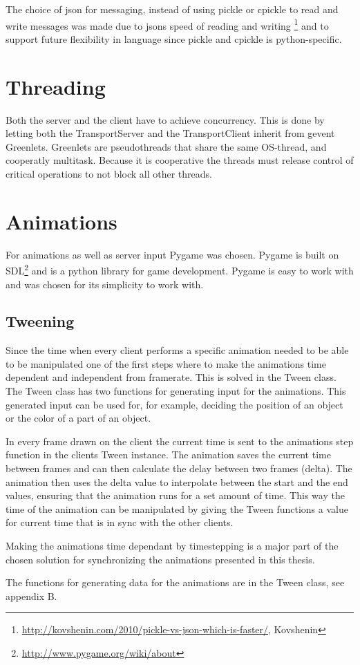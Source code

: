 The choice of json for messaging, instead of using pickle or cpickle to read and write messages was made due to jsons speed of reading and writing \footnote{\url{http://kovshenin.com/2010/pickle-vs-json-which-is-faster/}, Kovshenin} and to support future flexibility in language since pickle and cpickle is python-specific. 



\section{Threading}
\label{sec:threading}

Both the server and the client have to achieve concurrency. This is done by letting both the TransportServer and the TransportClient inherit from gevent Greenlets. 
Greenlets are pseudothreads that share the same OS-thread, and cooperatly multitask. Because it is cooperative the threads must release control of critical operations to not block all other threads. 

\section{Animations}

For animations as well as server input Pygame was chosen. Pygame is built on SDL\footnote{\url{http://www.pygame.org/wiki/about}} and is a python library for game development. Pygame is easy to work with and was chosen for its simplicity to work with.

\subsection{Tweening}

Since the time when every client performs a specific animation needed to be able to be manipulated one of the first steps where to make the animations time dependent and independent from framerate. This is solved in the Tween class. The Tween class has two functions for generating input for the animations. This generated input can be used for, for example, deciding the position of an object or the color of a part of an object. 

In every frame drawn on the client the current time is sent to the animations step function in the clients Tween instance. The animation saves the current time between frames and can then calculate the delay between two frames (delta). The animation then uses the delta value to interpolate between the start and the end values, ensuring that the animation runs for a set amount of time. This way the time of the animation can be manipulated by giving the Tween functions a value for current time that is in sync with the other clients. 

Making the animations time dependant by timestepping is a major part of the chosen solution for synchronizing the animations presented in this thesis. 

The functions for generating data for the animations are in the Tween class, see appendix B.  




